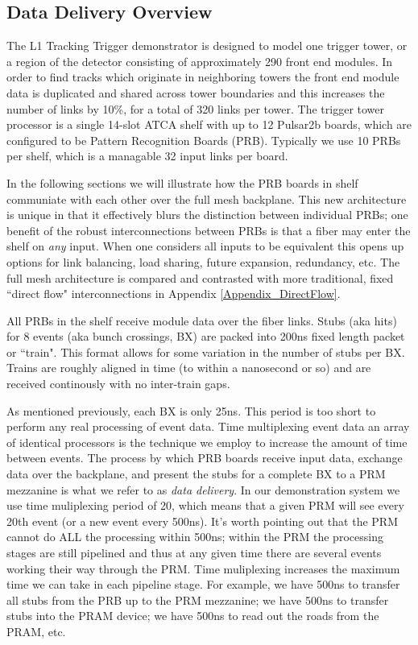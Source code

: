 \documentclass[letterpaper]{article}
\begin{document}
\subsection{Data Delivery Overview}

The L1 Tracking Trigger demonstrator is designed to model one trigger tower, or a region of the detector consisting of approximately 290 front end modules.  In order to find tracks which originate in neighboring towers the front end module data is duplicated and shared across tower boundaries and this increases the number of links by 10\%, for a total of 320 links per tower.  The trigger tower processor is a single 14-slot ATCA shelf with up to 12 Pulsar2b boards, which are configured to be Pattern Recognition Boards (PRB). Typically we use 10 PRBs per shelf, which is a managable 32 input links per board.

In the following sections we will illustrate how the PRB boards in shelf communiate with each other over the full mesh backplane.  This new architecture is unique in that it effectively blurs the distinction between individual PRBs; one benefit of the robust interconnections between PRBs is that a fiber may enter the shelf on \emph{any} input.  When one considers all inputs to be equivalent this opens up options for link balancing, load sharing, future expansion, redundancy, etc.  The full mesh architecture is compared and contrasted with more traditional, fixed ``direct flow" interconnections in Appendix \ref{Appendix_DirectFlow}.

All PRBs in the shelf receive module data over the fiber links.  Stubs (aka hits) for 8 events (aka bunch crossings, BX) are packed into 200ns fixed length packet or ``train".  This format allows for some variation in the number of stubs per BX. Trains are roughly aligned in time (to within a nanosecond or so) and are received continously with no inter-train gaps.

As mentioned previously, each BX is only 25ns.  This period is too short to perform any real processing of event data.  Time multiplexing event data an array of identical processors is the technique we employ to increase the amount of time between events.  The process by which PRB boards receive input data, exchange data over the backplane, and present the stubs for a complete BX to a PRM mezzanine is what we refer to as \emph{data delivery}.  In our demonstration system we use time muliplexing period of 20, which means that a given PRM will see every 20th event (or a new event every 500ns). It's worth pointing out that the PRM cannot do ALL the processing within 500ns; within the PRM the processing stages are still pipelined and thus at any given time there are several events working their way through the PRM.  Time muliplexing increases the maximum time we can take in each pipeline stage.  For example, we have 500ns to transfer all stubs from the PRB up to the PRM mezzanine; we have 500ns to transfer stubs into the PRAM device; we have 500ns to read out the roads from the PRAM, etc.
\end{document}
